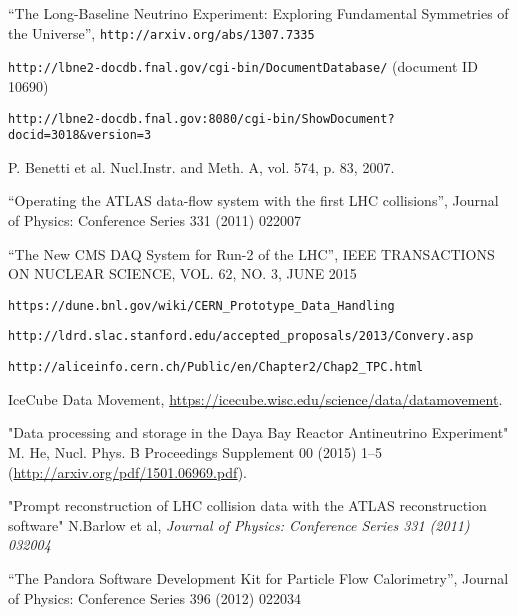 \begin{thebibliography}{99}

 ``The Long-Baseline Neutrino Experiment: Exploring Fundamental Symmetries of the Universe'',  \verb!http://arxiv.org/abs/1307.7335!

 \verb!http://lbne2-docdb.fnal.gov/cgi-bin/DocumentDatabase/! (document ID 10690)

 \verb!http://lbne2-docdb.fnal.gov:8080/cgi-bin/ShowDocument?docid=3018&version=3!

 P. Benetti et al. Nucl.Instr. and Meth. A, vol. 574, p. 83, 2007.

 ``Operating the ATLAS data-flow system with the first LHC collisions'', Journal of Physics: Conference Series 331 (2011) 022007

 ``The New CMS DAQ System for Run-2 of the LHC'', IEEE TRANSACTIONS ON NUCLEAR SCIENCE, VOL. 62, NO. 3, JUNE 2015

 \verb!https://dune.bnl.gov/wiki/CERN_Prototype_Data_Handling!

 \verb!http://ldrd.slac.stanford.edu/accepted_proposals/2013/Convery.asp!

 \verb!http://aliceinfo.cern.ch/Public/en/Chapter2/Chap2_TPC.html!

 IceCube Data Movement, \url{https://icecube.wisc.edu/science/data/datamovement}.

"Data processing and storage in the Daya Bay Reactor Antineutrino Experiment" M. He, Nucl. Phys. B Proceedings Supplement 00 (2015) 1–5 (\url{http://arxiv.org/pdf/1501.06969.pdf}).

 "Prompt reconstruction of LHC collision data with the ATLAS reconstruction software" N.Barlow et al, \textit{Journal of Physics: Conference Series 331 (2011) 032004}

 ``The Pandora Software Development Kit for Particle Flow Calorimetry'', Journal of Physics: Conference Series 396 (2012) 022034

\end{thebibliography}